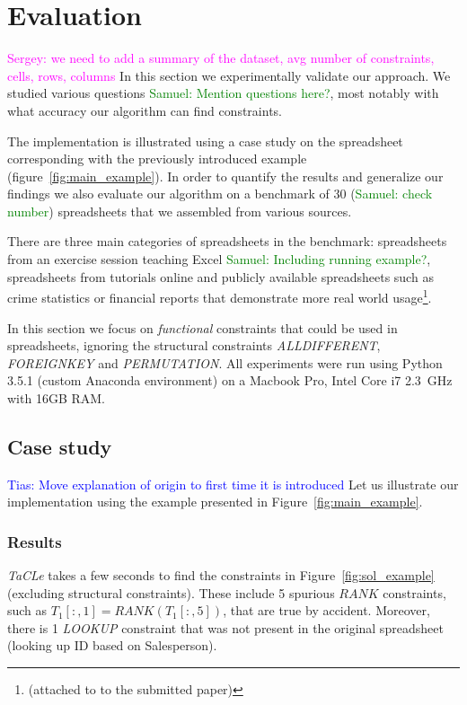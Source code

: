 \documentclass{IEEEtran}
\newcommand{\sergey}[1]{\textcolor{magenta}{{\sc Sergey:} #1}\xspace}
\newcommand{\samuel}[1]{\textcolor{green}{{\sc Samuel:} #1}\xspace}
\newcommand{\tias}[1]{\textcolor{blue}{{\sc Tias:} #1}\xspace}
\newcommand{\format}[1]{\textit{#1}\xspace}
\newcommand{\sname}{\format{TaCLe}}
\newcommand{\range}[3]{\ensuremath{#1[#2,#3]}}
\newcommand{\rangeall}{:}
\newcommand{\eccalc}[2]{\ensuremath{#1 = #2}}
\newcommand{\ecrank}[2]{\eccalc{#1}{\textit{RANK}(#2)}}
\theoremstyle{definition}
\begin{document}
\newcommand{\runfile}{0.50}
\newcommand{\runfilestd}{0.02}

\section{Evaluation}\label{sec:evaluation}
\sergey{we need to add a summary of the dataset, avg number of constraints, cells, rows, columns}
In this section we experimentally validate our approach.
We studied various questions \samuel{Mention questions here?}, most notably with what accuracy our algorithm can find constraints.

The implementation is illustrated using a case study on the spreadsheet corresponding with the previously introduced example (figure~\ref{fig:main_example}).
In order to quantify the results and generalize our findings we also evaluate our algorithm on a benchmark of 30 (\samuel{check number}) spreadsheets that we assembled from various sources.

There are three main categories of spreadsheets in the benchmark: spreadsheets from an exercise session teaching Excel \samuel{Including running example?}, spreadsheets from tutorials online and publicly available spreadsheets such as crime statistics or financial reports that demonstrate more real world usage\footnote{(attached to to the submitted paper)}.

In this section we focus on \textit{functional} constraints that could be used in spreadsheets, ignoring the structural constraints \textit{ALLDIFFERENT}, \textit{FOREIGNKEY} and \textit{PERMUTATION}.
All experiments were run using Python 3.5.1 (custom Anaconda environment) on a Macbook Pro, Intel Core i7 2.3~GHz with 16GB RAM.






\subsection{Case study}
\tias{Move explanation of origin to first time it is introduced}
Let us illustrate our implementation using the example presented in Figure~\ref{fig:main_example}.

\subsubsection{Results}
\sname takes a few seconds to find the constraints in Figure~\ref{fig:sol_example} (excluding structural constraints).
These include 5 spurious $\mathit{RANK}$ constraints, such as $\ecrank{\range{T_1}{\rangeall}{1}}{\range{T_1}{\rangeall}{5}}$, that are true by accident.
Moreover, there is 1 \textit{LOOKUP} constraint that was not present in the original spreadsheet (looking up ID based on Salesperson).
\end{document}
